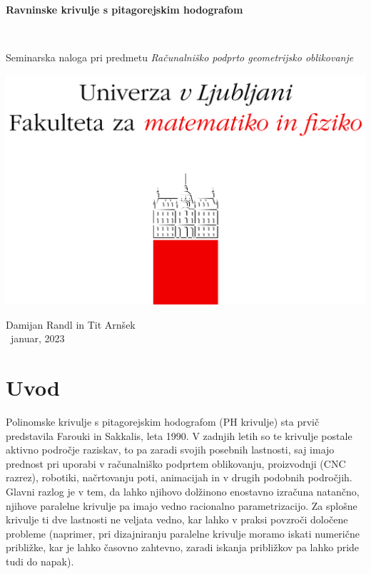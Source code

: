 \documentclass[12pt]{article}
\begin{document}
\thispagestyle{empty}
\begin{center}
\begin{Large}
{\bf Ravninske krivulje s pitagorejskim hodografom}
\end{Large}
\\[5mm]
\begin{large}
Seminarska naloga pri predmetu {\em Računalniško podprto geometrijsko oblikovanje }
\\[5mm]
\begin{center}
	\includegraphics{fmf.png}	
\end{center}
\vspace*{\fill}

{\sc Damijan Randl in Tit Arnšek}
\\[10mm]
~januar, 2023
\end{large}

\end{center}

\newpage
\tableofcontents

\newpage
\setcounter{page}{1}

\section{Uvod}
Polinomske krivulje s pitagorejskim hodografom (PH krivulje) sta prvič predstavila Farouki in Sakkalis, leta 1990.
V zadnjih letih so te krivulje postale aktivno področje raziskav,
to pa zaradi svojih posebnih lastnosti, 
saj imajo prednost pri uporabi v računalniško podprtem oblikovanju,
proizvodnji (CNC razrez), robotiki, načrtovanju poti, animacijah in v drugih 
podobnih področjih. Glavni razlog je v tem, da lahko njihovo dolžinono enostavno izračuna natančno,
njihove paralelne krivulje pa imajo vedno racionalno parametrizacijo.
\newline
Za splošne krivulje ti dve lastnosti ne veljata vedno, 
kar lahko v praksi povzroči določene probleme (naprimer, pri dizajniranju paralelne krivulje 
moramo iskati numerične približke, kar je lahko časovno zahtevno,
zaradi iskanja približkov pa lahko pride tudi do napak).
\end{document}
